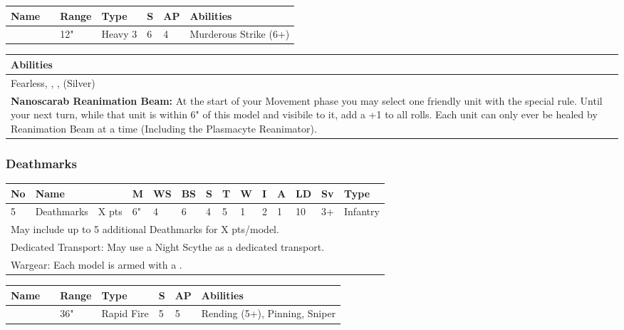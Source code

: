 \noindent
\begin{tabular}{||m{110pt} m{30pt} m{31pt} m{55pt} m{12pt} m{12pt} m{210pt}||}
	\hline
	Name & & Range & Type & S & AP & Abilities \\
	\hline
	\quickref{Atomiser Beam Lance} & & 12" & Heavy 3 & 6 & 4 & Murderous Strike (6+) \\
	\hline
\end{tabular}

\noindent
\begin{tabular}{||m{532pt}||}
	\hline
	Abilities \\
	\hline
	Fearless, \quickref{Living Metal}, \quickref{Reanimation Protocols}, \quickref{Soulless Hordes} (Silver) \\
	\textbf{Nanoscarab Reanimation Beam:} At the start of your Movement phase you may select one friendly unit with the \quickref{Reanimation Protocols} special rule. Until your next turn, while that unit is within 6" of this model and visibile to it, add a +1 to all \quickref{Reanimation Protocols} rolls. Each unit can only ever be healed by Reanimation Beam at a time (Including the Plasmacyte Reanimator). \\ 
	\hline
\end{tabular}




\newpage
\subsubsection{Deathmarks}

\noindent
\begin{tabular}{||m{10pt} m{95pt} m{30pt} m{11pt} m{11pt} m{11pt} m{11pt} m{11pt} m{11pt} m{11pt} m{11pt} m{11pt} m{11pt} m{125pt}||}
	\hline
	No & Name & & M & WS & BS & S & T & W & I & A & LD & Sv & Type \\
	\hline
	5 & Deathmarks & X pts & 6" & 4 & 6 & 4 & 5 & 1 & 2 & 1 & 10 & 3+ & Infantry \\
	\hline
	\hline
	\multicolumn{14}{||Z{532 pt}||}{May include up to 5 additional Deathmarks for X pts/model.}\\	
	\multicolumn{14}{||Z{532 pt}||}{Dedicated Transport: May use a Night Scythe as a dedicated transport.}\\
	\hline
	\hline
	\multicolumn{14}{||Z{532 pt}||}{Wargear: Each model is armed with a \quickref{Synaptic Disnitegrator}.} \\
	\hline
\end{tabular}

\noindent
\begin{tabular}{||m{140pt} m{00pt} m{31pt} m{55pt} m{12pt} m{12pt} m{210pt}||}
	\hline
	Name & & Range & Type & S & AP & Abilities \\
	\hline
	\quickref{Synaptic Disintegrator} &  & 36" & Rapid Fire & 5 & 5 & Rending (5+), Pinning, Sniper \\
	\hline
\end{tabular}

